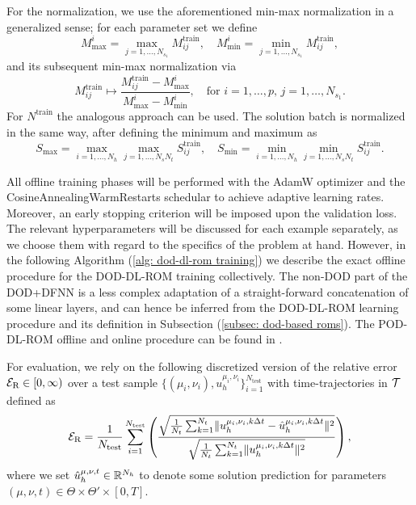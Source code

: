 For the normalization, we use the aforementioned min-max normalization in a generalized sense; for
each parameter set we define 
\begin{equation*}
    M_\text{max}^{i} = \max\limits_{j = 1, \dots, N_{s_1}} M_{ij}^\text{train}, \quad 
    M_\text{min}^{i} = \min\limits_{j = 1, \dots, N_{s_1}} M_{ij}^\text{train},
\end{equation*}
and its subsequent min-max normalization via
\begin{equation} \label{eq: min-max normalization}
    M_{ij}^\text{train} \mapsto \frac{M_{ij}^\text{train} - M_\text{max}^i}{M_\text{max}^i - M_\text{min}^i},
    \quad \text{for } i = 1, \dots, p, \, j = 1, \dots, N_{s_1}.
\end{equation}
For $N^\text{train}$ the analogous approach can be used. The solution batch is normalized in the
same way, after defining the minimum and maximum as
\begin{equation*}
    S_\text{max} = \max\limits_{i = 1, \dots, N_h} \max\limits_{j = 1, \dots, N_s N_t} S_{ij}^\text{train},
    \quad S_\text{min} = \min\limits_{i = 1, \dots, N_h} \min\limits_{j = 1, \dots, N_s N_t} S_{ij}^\text{train}.
\end{equation*}

All offline training phases will be performed with the AdamW optimizer and the CosineAnnealingWarmRestarts schedular 
to achieve adaptive learning rates. Moreover, an early stopping criterion will be imposed upon the
validation loss. The relevant hyperparameters will be discussed for each example separately,
as we choose them with regard to the specifics of the problem at hand. However, in the following
Algorithm (\ref{alg: dod-dl-rom training})
we describe the exact offline procedure for the DOD-DL-ROM training collectively. The non-DOD part of
the DOD+DFNN is a less complex adaptation of a straight-forward concatenation of some linear layers, 
and can hence be inferred from the DOD-DL-ROM learning procedure and its definition in Subsection
(\ref{subsec: dod-based roms}).
The POD-DL-ROM offline and online procedure can be found in \cite{fresca2022}.


For evaluation, we rely on the following discretized version of the relative error $\mathcal{E}_\text{R} \in [0, \infty)$
over a test sample $\{(\mu_i, \nu_i), u_h^{\mu_i, \nu_i}\}_{i=1}^{N_\text{test}}$ with time-trajectories
in $\mathcal{T}$ defined as
\begin{equation*}
    \mathcal{E}_\text{R} = \frac{1}{N_\text{test}} \sum_{i=1}^{N_\text{test}} \left(
        \frac{
            \sqrt{\frac{1}{N_t} \sum_{k=1}^{N_t} \lVert u_h^{\mu_i, \nu_i, k \Delta t} - 
            \hat{u}_h^{\mu_i, \nu_i, k \Delta t} \rVert^2}
        }{
            \sqrt{\frac{1}{N_t} \sum_{k=1}^{N_t} \lVert u_h^{\mu_i, \nu_i, k \Delta t} \rVert^2}
        }
        \right),
\end{equation*}
where we set $\hat{u}_h^{\mu, \nu, t} \in \mathbb{R}^{N_h}$ to denote some solution prediction for parameters $(\mu, \nu, t)
\in \Theta \times \Theta' \times [0, T]$. 


